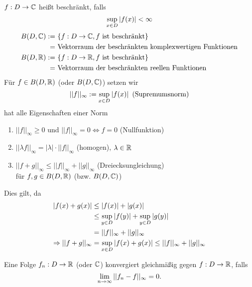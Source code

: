 \documentclass[../ana1.tex]{subfiles}
\begin{document}
\begin{defi}
    \( f: D \rightarrow \mathbb{C} \) heißt beschränkt, falls 
    \[ \underset{x\in D}{\sup} \left|f(x)\right| < \infty \]
    \begin{align*}
        B(D, \mathbb{C}) :=\ &\{ f: D \rightarrow \mathbb{C}, 
        f \text{ ist beschränkt} \} \\
        =\ &\text{Vektorraum der beschränkten 
        komplexwertigen Funktionen} \\
        B(D, \mathbb{R}) :=\ &\{ f: D \rightarrow \mathbb{R}, 
        f \text{ ist beschränkt} \} \\
        =\ &\text{Vektorraum der beschränkten reellen Funktionen}
    \end{align*}
    Für \( f\in B(D,\mathbb{R}) \) (oder \( B(D,\mathbb{C}) \)) setzen wir 
    \[ ||f||_\infty := \underset{x\in D}{\sup} \left|f(x)\right| 
    \text{ (Supremumsnorm)} \]
    hat alle Eigenschaften einer Norm
    \begin{enumerate}
        \item \( ||f||_\infty \geq 0 \) und 
        \( ||f||_\infty = 0 \Leftrightarrow f = 0 \) 
        (Nullfunktion)
        \item \( ||\lambda f||_\infty = |\lambda| \cdot 
        ||f||_\infty \) (homogen), \( \lambda \in \mathbb{R} \)
        \item \( ||f+g||_\infty \leq ||f||_\infty 
        + ||g||_\infty \) (Dreiecksungleichung) \\
        für \( f, g \in B(D, \mathbb{R}) \) (bzw. \( B(D,\mathbb{C}) \))
    \end{enumerate}
    Dies gilt, da
    \begin{align*}
        \left| f(x) + g(x) \right| &\leq \left|f(x)\right| + \left|g(x)\right| \\
        &\leq \underset{y\in D}{\sup} \left| f(y) \right| 
        + \underset{y\in D}{\sup} \left|g(y)\right|\\
        &= ||f||_\infty + ||g||_\infty \\
        \Rightarrow ||f + g||_\infty &= \underset{x\in D}{\sup}
        \left|f(x) + g(x)\right| \leq ||f||_\infty + ||g||_\infty
    \end{align*}
\end{defi}
\begin{defi}
    Eine Folge \( f_n:D\rightarrow \mathbb{R} \) (oder \( \mathbb{C} \)) 
    konvergiert gleichmäßig gegen \( f: D \rightarrow \mathbb{R} \), 
    falls 
    \[ \lim\limits_{n\rightarrow\infty} ||f_n - f ||_\infty = 0. \]
\end{defi}
\end{document}
